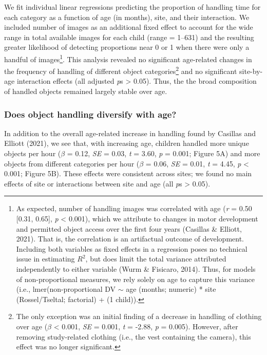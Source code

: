 \documentclass[10pt, letterpaper]{article}
\begin{document}
We fit individual linear regressions predicting the proportion of
handling time for each category as a function of age (in months), site,
and their interaction. We included number of images as an additional
fixed effect to account for the wide range in total available images for
each child (range = 1--631) and the resulting greater likelihood of
detecting proportions near 0 or 1 when there were only a handful of
images\footnote{As expected, number of handling images was correlated
  with age (\emph{r} = 0.50 {[}0.31, 0.65{]}, \emph{p} \textless{}
  0.001), which we attribute to changes in motor development and
  permitted object access over the first four years (Casillas \&
  Elliott, 2021). That is, the correlation is an artifactual outcome of
  development. Including both variables as fixed effects in a regression
  poses no technical issue in estimating \(R^{2}\), but does limit the
  total variance attributed independently to either variable (Wurm \&
  Fisicaro, 2014). Thus, for models of non-proportional measures, we
  rely solely on age to capture this variance (i.e.,
  lmer(non-proportional DV \({\sim}\) age (months; numeric) * site
  (Rossel/Tseltal; factorial) + (1 \textbar{} child)).}. This analysis
revealed no significant age-related changes in the frequency of handling
of different object categories\footnote{The only exception was an
  initial finding of a decrease in handling of clothing over age
  (\(\beta\) \textless{} 0.001, \emph{SE} = 0.001, \emph{t} = -2.88,
  \emph{p} = 0.005). However, after removing study-related clothing
  (i.e., the vest containing the camera), this effect was no longer
  significant.} and no significant site-by-age interaction effects (all
adjusted \emph{p}s \textgreater{} 0.05). Thus, the the broad composition
of handled objects remained largely stable over age. \newline

\hypertarget{does-object-handling-diversify-with-age}{%
\subsubsection{Does object handling diversify with
age?}\label{does-object-handling-diversify-with-age}}

In addition to the overall age-related increase in handling found by
Casillas and Elliott (2021), we see that, with increasing age, children
handled more unique objects per hour (\(\beta\) = 0.12, \emph{SE} =
0.03, \emph{t} = 3.60, \emph{p} = 0.001; Figure 5A) and more objects
from different categories per hour (\(\beta\) = 0.06, \emph{SE} = 0.01,
\emph{t} = 4.45, \emph{p} \textless{} 0.001; Figure 5B). These effects
were consistent across sites; we found no main effects of site or
interactions between site and age (all \emph{p}s \textgreater{}
0.05).\newline
\end{document}
